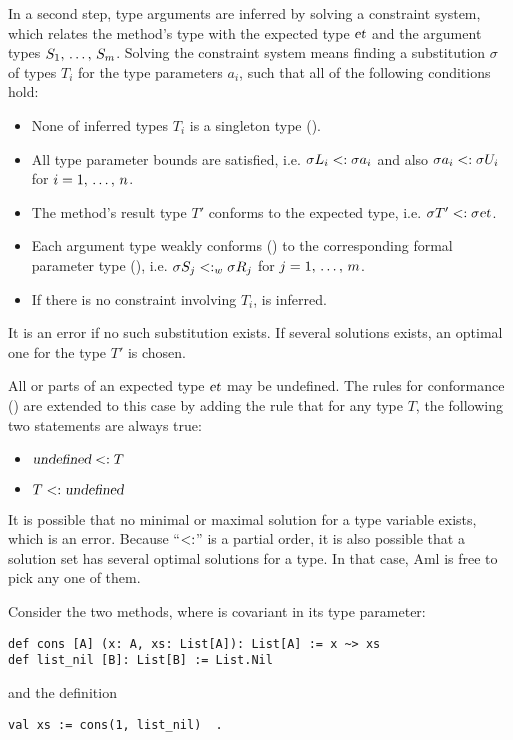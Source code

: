 In a second step, type arguments are inferred by solving a constraint system, which relates the method's type with the expected type $\mbox{\sl et}$ and the argument types $S_1 ,\, \ldots ,\, S_m$. Solving the constraint system means finding a substitution $\sigma$ of types $T_i$ for the type parameters $a_i$, such that all of the following conditions hold:
\begin{itemize}
  \item None of inferred types $T_i$ is a singleton type (). %
  \item All type parameter bounds are satisfied, i.e. $\sigma L_i <: \sigma a_i$ and also $\sigma a_i <: \sigma U_i$ for $i = 1 ,\, \ldots ,\, n$. 
  \item The method's result type $T'$ conforms to the expected type, i.e. $\sigma T' <: \sigma \mbox{\sl et}$. 
  \item Each argument type weakly conforms () to the corresponding formal parameter type (), i.e. $\sigma S_j <: _w \sigma R_j$ for $j = 1 ,\, \ldots ,\, m$. 
  \item If there is no constraint involving $T_i$,  is inferred. 
\end{itemize}

It is an error if no such substitution exists. If several solutions exists, an optimal one for the type $T'$ is chosen. 

All or parts of an expected type $\mbox{\sl et}$ may be undefined. The rules for conformance () are extended to this case by adding the rule that for any type $T$, the following two statements are always true:
\begin{itemize}
  \item $\mbox{\sl undefined} <: T$
  \item $T <: \mbox{\sl undefined}$
\end{itemize}

It is possible that no minimal or maximal solution for a type variable exists, which is an error. Because ``$<:$'' is a partial order, it is also possible that a solution set has several optimal solutions for a type. In that case, Aml is free to pick any one of them. 

\example Consider the two methods, where  is covariant in its type parameter:
\begin{lstlisting}
def cons [A] (x: A, xs: List[A]): List[A] := x ~> xs
def list_nil [B]: List[B] := List.Nil
\end{lstlisting}
and the definition
\begin{lstlisting}
val xs := cons(1, list_nil)  .
\end{lstlisting}

